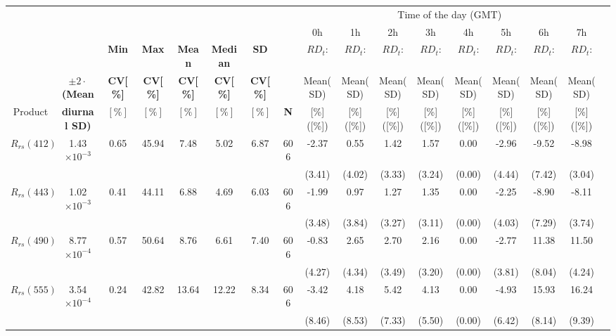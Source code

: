 \documentclass[preview]{standalone}
\begin{document}
\scriptsize
\centering
\setlength\tabcolsep{1.5pt} %
\begin{tabular}{ccccccccccccccccc} \hline
 &&&&&&  &  &   \multicolumn{8}{c}{Time of the day (GMT)} &   \\ \cline{9-16}
 &&&&&& &  &    0h    & 1h  &  2h  &  3h  &  4h  &  5h  &  6h   &  7h &   \\ 
   &  & \bfseries{Min} & \bfseries{Max} & \bfseries{Mean} & \bfseries{Median} & \bfseries{SD} &  &    $RD_t$:    & $RD_t$:  &  $RD_t$:  &  $RD_t$:  &  $RD_t$:  &  $RD_t$:  &  $RD_t$:   &  $RD_t$:  \\ 
   & \bfseries{$\pm2\cdot$(Mean} & \bfseries{CV[\%]} & \bfseries{CV[\%]} & \bfseries{CV[\%]} & \bfseries{CV[\%]} & \bfseries{CV[\%]} &  &    Mean(SD)    & Mean(SD)  &  Mean(SD)  &  Mean(SD)  &  Mean(SD)  &  Mean(SD)  &  Mean(SD)   &  Mean(SD) &  \\ 
Product  & \bfseries{diurnal SD)}  & $[\%]$ & $[\%]$ & $[\%]$ & $[\%]$ & $[\%]$  & \bfseries{N} &    [\%]([\%])    & [\%]([\%])  &  [\%]([\%])  &  [\%]([\%])  &  [\%]([\%])  &  [\%]([\%])  &  [\%]([\%])   &  [\%]([\%])   \\ \hline \hline
$R_{rs}(412)$ 	& 1.43$\times10^{-3}$ 	& 0.65 	&  45.94	&  7.48 &  5.02 &  6.87 & 606  	&  -2.37 	&  0.55 	& 1.42 		& 1.57 		&  0.00 	& -2.96 	& -9.52  	& -8.98  	\\
 				&						&		&			&		&		&		&		& (3.41) 	& (4.02) 	& (3.33) 	& (3.24) 	& (0.00) 	& (4.44) 	& (7.42) 	& (3.04) 	\\ \hline
$R_{rs}(443)$ 	& 1.02$\times10^{-3}$ 	& 0.41 	&  44.11 	&  6.88 &  4.69 &  6.03 & 606  	&   -1.99  	&  0.97  	& 1.27  	& 1.35   	&  0.00  	&  -2.25   	& -8.90   	& -8.11  	\\ 
 				&						&		&			&		&		&		&		&  (3.48) 	&  (3.84) 	&  (3.27) 	&  (3.11) 	&  (0.00) 	&  (4.03) 	&  (7.29) 	&  (3.74) 	\\ \hline
$R_{rs}(490)$ 	& 8.77$\times10^{-4}$ 	& 0.57 	&  50.64 	&  8.76 &  6.61 &  7.40 & 606  	&   -0.83  	& 2.65   	&  2.70 	&  2.16  	&  0.00   	&  -2.77   	& 11.38   	& 11.50  	\\
 				&						&		&			&		&		&		&		&  (4.27) 	&  (4.34) 	&  (3.49) 	&  (3.20) 	&  (0.00) 	&  (3.81) 	&  (8.04) 	&  (4.24) 	\\ \hline   
$R_{rs}(555)$ 	& 3.54$\times10^{-4}$ 	& 0.24 	&  42.82 	& 13.64 & 12.22 &  8.34 & 606  	&   -3.42   &  4.18   	&  5.42 	&  4.13  	&  0.00   	&  -4.93   	& 15.93   	& 16.24  	\\
 				&						&		&			&		&		&		&		&  (8.46) 	&  (8.53) 	&  (7.33) 	&  (5.50) 	&  (0.00) 	&  (6.42) 	&  (8.14) 	&  (9.39) 	\\ \hline   

\end{tabular}
\end{document}
